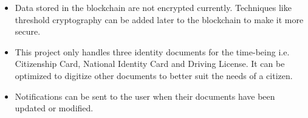 \begin{itemize}
    \item Data stored in the blockchain are not encrypted currently. Techniques like threshold cryptography can be added later to the blockchain to make it more secure.
    \item This project only handles three identity documents for the time-being i.e. Citizenship Card, National Identity Card and Driving License. It can be optimized to digitize other documents to better suit the needs of a citizen.
    \item Notifications can be sent to the user when their documents have been updated or modified. 
    
\end{itemize}






